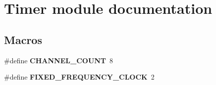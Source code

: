 \hypertarget{group___timer__module}{}\section{Timer module documentation}
\label{group___timer__module}
\subsection*{Macros}
\begin{DoxyCompactItemize}
\item 
\hypertarget{group___timer__module_ga29e42927003b0aa647ee45965f4ccb07}{}\#define {\bfseries C\+H\+A\+N\+N\+E\+L\+\_\+\+C\+O\+U\+N\+T}~8\label{group___timer__module_ga29e42927003b0aa647ee45965f4ccb07}

\item 
\hypertarget{group___timer__module_gaefbf99e8815b4feccfa0fbc0126f05b6}{}\#define {\bfseries F\+I\+X\+E\+D\+\_\+\+F\+R\+E\+Q\+U\+E\+N\+C\+Y\+\_\+\+C\+L\+O\+C\+K}~2\label{group___timer__module_gaefbf99e8815b4feccfa0fbc0126f05b6}

\end{DoxyCompactItemize}

